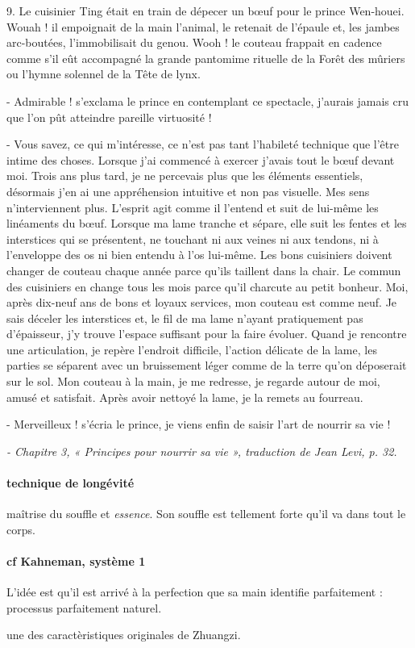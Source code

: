      
  \begin{singlequote}
      9. Le cuisinier Ting était en train de dépecer un bœuf pour le prince Wen-houei. Wouah ! il  empoignait de la main l’animal, le retenait de l’épaule et, les jambes arc-boutées, l’immobilisait du genou. 
      Wooh ! le couteau frappait en cadence comme s’il eût accompagné la grande pantomime rituelle de la Forêt des mûriers ou l’hymne solennel de la Tête de lynx. 
      
      - Admirable ! s’exclama le prince en contemplant ce spectacle, j’aurais jamais cru que l’on pût atteindre pareille virtuosité ! 
      
      - Vous savez, ce qui m’intéresse, ce n’est pas tant l’habileté technique que l’être intime des choses. Lorsque j’ai commencé à exercer j’avais tout le bœuf devant moi. Trois ans plus tard, je ne percevais plus que les éléments essentiels, désormais j’en ai une appréhension intuitive et non pas visuelle. Mes sens n’interviennent plus. L’esprit agit comme il l’entend et suit de lui-même les linéaments du bœuf. Lorsque ma lame tranche et sépare, elle suit les fentes et les interstices qui se présentent, ne touchant ni aux veines ni aux tendons, ni à l’enveloppe des os ni bien entendu à l’os lui-même. Les bons cuisiniers doivent changer de couteau chaque année parce qu’ils taillent dans la chair. Le commun des cuisiniers en change tous les mois parce qu’il charcute au petit bonheur. Moi, après dix-neuf ans de bons et loyaux services, mon couteau est comme neuf. Je sais déceler les interstices et, le fil de ma lame n’ayant pratiquement pas d’épaisseur, j’y trouve l’espace suffisant pour la faire évoluer. Quand je rencontre une articulation, je repère l’endroit difficile, l’action délicate de la lame, les parties se séparent avec un bruissement léger comme de la terre qu’on déposerait sur le sol. Mon couteau à la main, je me redresse, je regarde autour de moi, amusé et satisfait. Après avoir nettoyé la lame, je la remets au fourreau.  
      
      - Merveilleux ! s’écria le prince, je viens enfin de saisir l’art de nourrir sa vie !  
      
\textit{  \small    - Chapitre 3, « Principes pour nourrir sa vie », traduction de Jean Levi, p. 32.}
  \end{singlequote}
 
  \paragraph{technique de longévité} maîtrise du souffle et \textit{essence}. Son souffle est tellement forte qu'il va dans tout le corps.


  \paragraph{cf Kahneman, système 1} L'idée est qu'il est arrivé à la perfection que sa main identifie parfaitement : processus parfaitement naturel. 

  \begin{Def}
    une des caractèristiques originales de Zhuangzi.    
  \end{Def}